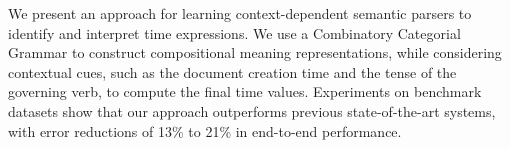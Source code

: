 We present an approach for learning context-dependent semantic parsers to identify and interpret time expressions. We use a Combinatory Categorial Grammar to construct compositional meaning representations, while considering contextual cues, such as the document creation time and the tense of the governing verb, to compute the final time values. Experiments on benchmark datasets show that our approach outperforms previous state-of-the-art systems, with error reductions of 13\% to 21\% in end-to-end performance.
